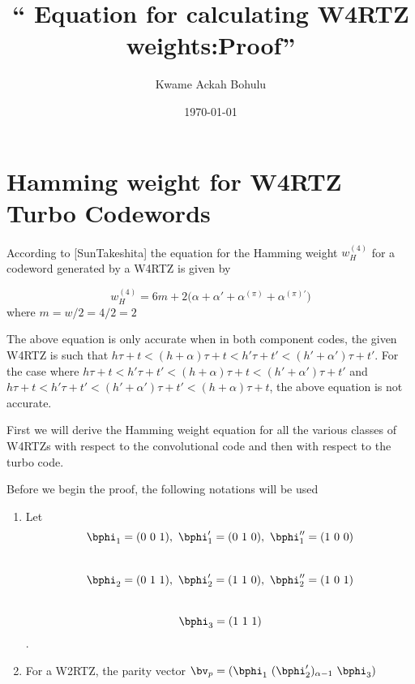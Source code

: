 \documentclass[11pt, oneside, dvipdfmx]{book}
\title{``
Equation for calculating W4RTZ weights:Proof'' }
\author{Kwame Ackah Bohulu}
\date{\today}
\begin{document}
\maketitle
\section{Hamming weight for W4RTZ Turbo Codewords}
According to [SunTakeshita] the equation for the Hamming weight $w_H^{(4)}$ for a codeword generated by a W4RTZ is given by

\begin{equation}
w_H^{(4)} = 6m+2\Big(\alpha+\alpha' +\alpha^{(\pi)} +\alpha^{(\pi)'}\Big)
\label{RTZInputs-3}
\end{equation}
where $m=w/2 = 4/2 = 2$

The above equation is only accurate when in both component codes, the given W4RTZ is such that 
$h\tau+t<(h + \alpha)\tau+t<h'\tau+t'<(h' + \alpha')\tau+t'$.  For the case where $h\tau+t<h'\tau+t'<(h + \alpha)\tau+t<(h' + \alpha')\tau+t'$ and 
$h\tau+t<h'\tau+t'<(h' + \alpha')\tau+t'<(h + \alpha)\tau+t$, the above equation is not accurate.

First we will derive the Hamming weight equation for all the various classes of W4RTZs with respect to the convolutional code and then with respect to the turbo code.

Before we begin the proof, the following notations will be used

\begin{enumerate}
\item Let 
$$\bphi_1=(0~0~1),~\bphi'_1=(0~1~0),~\bphi''_1=(1~0~0)$$ \\
$$\bphi_2=(0~1~1),~\bphi'_2=(1~1~0),~\bphi''_2=(1~0~1)$$ \\
$$\bphi_3=(1~1~1)$$.

\item For a W2RTZ, the parity vector $\bv_p=(\bphi_1~ (\bphi'_2)_{\alpha-1}~ \bphi_3)$
\end{enumerate} 
\end{document}
